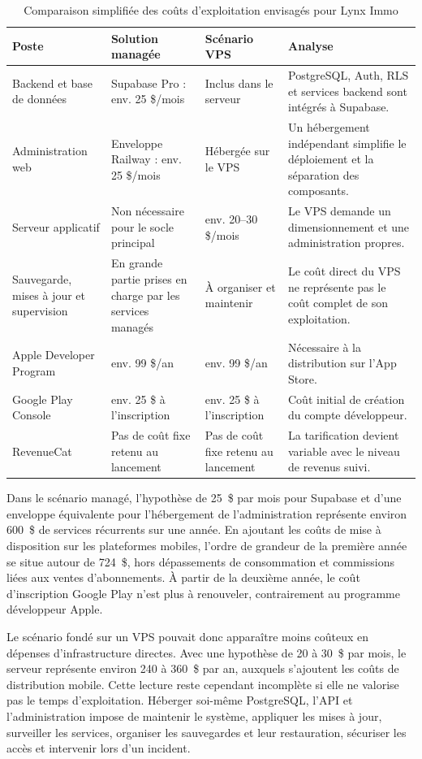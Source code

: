 \begin{table}[H]
\centering
\begin{tabular}{p{4.0cm} p{3.0cm} p{3.0cm} p{4.0cm}}
\toprule
\textbf{Poste} & \textbf{Solution managée} & \textbf{Scénario VPS} & \textbf{Analyse} \\
\midrule
Backend et base de données & Supabase Pro : env. 25 \$/mois & Inclus dans le serveur & PostgreSQL, Auth, RLS et services backend sont intégrés à Supabase. \\
Administration web & Enveloppe Railway : env. 25 \$/mois & Hébergée sur le VPS & Un hébergement indépendant simplifie le déploiement et la séparation des composants. \\
Serveur applicatif & Non nécessaire pour le socle principal & env. 20--30 \$/mois & Le VPS demande un dimensionnement et une administration propres. \\
Sauvegarde, mises à jour et supervision & En grande partie prises en charge par les services managés & À organiser et maintenir & Le coût direct du VPS ne représente pas le coût complet de son exploitation. \\
Apple Developer Program & env. 99 \$/an & env. 99 \$/an & Nécessaire à la distribution sur l'App Store. \\
Google Play Console & env. 25 \$ à l'inscription & env. 25 \$ à l'inscription & Coût initial de création du compte développeur. \\
RevenueCat & Pas de coût fixe retenu au lancement & Pas de coût fixe retenu au lancement & La tarification devient variable avec le niveau de revenus suivi. \\
\bottomrule
\end{tabular}
\caption{Comparaison simplifiée des coûts d'exploitation envisagés pour Lynx Immo}
\label{tab:lynx-couts-architecture}
\end{table}

Dans le scénario managé, l'hypothèse de 25~\$ par mois pour Supabase et d'une enveloppe équivalente pour l'hébergement de l'administration représente environ 600~\$ de services récurrents sur une année. En ajoutant les coûts de mise à disposition sur les plateformes mobiles, l'ordre de grandeur de la première année se situe autour de 724~\$, hors dépassements de consommation et commissions liées aux ventes d'abonnements. À partir de la deuxième année, le coût d'inscription Google Play n'est plus à renouveler, contrairement au programme développeur Apple.

Le scénario fondé sur un VPS pouvait donc apparaître moins coûteux en dépenses d'infrastructure directes. Avec une hypothèse de 20 à 30~\$ par mois, le serveur représente environ 240 à 360~\$ par an, auxquels s'ajoutent les coûts de distribution mobile. Cette lecture reste cependant incomplète si elle ne valorise pas le temps d'exploitation. Héberger soi-même PostgreSQL, l'API et l'administration impose de maintenir le système, appliquer les mises à jour, surveiller les services, organiser les sauvegardes et leur restauration, sécuriser les accès et intervenir lors d'un incident.

